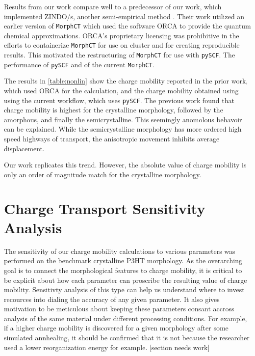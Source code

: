 Results from our work compare well to a predecessor of our work, which implemented ZINDO/s, another
semi-empirical  method \cite{Miller2018a}\cite{jones2017}. 
Their work utilized an earlier version of \texttt{MorphCT} which used the  software 
ORCA \cite{Neese2012b} to provide the quantum chemical approximations. 
ORCA's proprietary licensing was prohibitive in the efforts to containerize \texttt{MorphCT} for use on cluster and for
creating reproducible results. This motivated the restructuring of \texttt{MorphCT} for use with \texttt{pySCF}. The
performance of \texttt{pySCF} and of the current \texttt{MorphCT}.

The results in \ref{table:nonlin} show the charge mobility reported in the prior work, which used ORCA for
the  calculation, and the charge mobility obtained using using the current workflow, which uses \texttt{pySCF}. 
The previous work found that charge mobility is highest for the crystalline morphology, followed by the
amorphous, and finally the semicrystalline. This seemingly anomolous behavoir can be explained. While the
semicrystalline morphology has more ordered high speed highways of transport, the anisotropic movement
inhibits average displacement. 

Our work replicates this trend. However, the absolute value of charge mobility is only an order of magnitude
match for the crystalline morphology. 

\section{Charge Transport Sensitivity Analysis}

\label{sensitivity}

The sensitivity of our charge mobility calculations to various parameters was performed on the benchmark 
crystalline P3HT morphology. As the overarching goal is to connect the morphological features to charge
mobility, it is critical to be explicit about how each parameter can proscribe the resulting value of charge
mobility. Sensitivty analysis of this type can help us understand where to invest recources into dialing
the accuracy of any given parameter. It also gives motivation to be meticulous about keeping these parameters
consant accross analysis of the same material under different processing conditions. For example, if a higher
charge mobility is discovered for a given morphology after some simulated annhealing,
it should be confirmed that it is not because the researcher used a lower reorganization energy for example. 
[section needs work]


